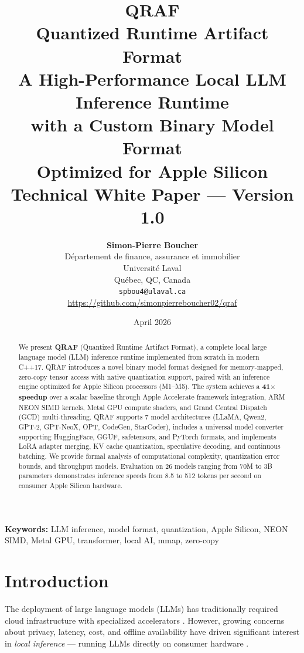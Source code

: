 \documentclass[12pt,a4paper]{article}
\title{
    \vspace{-1cm}
    {\Huge\textbf{QRAF}}\\[0.3em]
    {\Large\textbf{Quantized Runtime Artifact Format}}\\[0.8em]
    {\large A High-Performance Local LLM Inference Runtime\\with a Custom Binary Model Format\\Optimized for Apple Silicon}\\[0.8em]
    {\normalsize Technical White Paper --- Version 1.0}
}
\author{
    \textbf{Simon-Pierre Boucher}\\[0.3em]
    D\'{e}partement de finance, assurance et immobilier\\
    Universit\'{e} Laval\\
    Qu\'{e}bec, QC, Canada\\[0.3em]
    \texttt{spbou4@ulaval.ca}\\[0.5em]
    \url{https://github.com/simonpierreboucher02/qraf}
}
\date{April 2026}
\begin{document}
\maketitle
\thispagestyle{empty}

\begin{abstract}
\noindent
We present \textbf{QRAF} (Quantized Runtime Artifact Format), a complete local large language model (LLM) inference runtime implemented from scratch in modern C++17. QRAF introduces a novel binary model format designed for memory-mapped, zero-copy tensor access with native quantization support, paired with an inference engine optimized for Apple Silicon processors (M1--M5). The system achieves a \textbf{41$\times$ speedup} over a scalar baseline through Apple Accelerate framework integration, ARM NEON SIMD kernels, Metal GPU compute shaders, and Grand Central Dispatch (GCD) multi-threading. QRAF supports 7 model architectures (LLaMA, Qwen2, GPT-2, GPT-NeoX, OPT, CodeGen, StarCoder), includes a universal model converter supporting HuggingFace, GGUF, safetensors, and PyTorch formats, and implements LoRA adapter merging, KV cache quantization, speculative decoding, and continuous batching. We provide formal analysis of computational complexity, quantization error bounds, and throughput models. Evaluation on 26 models ranging from 70M to 3B parameters demonstrates inference speeds from 8.5 to 512 tokens per second on consumer Apple Silicon hardware.
\end{abstract}

\vspace{0.5em}
\noindent\textbf{Keywords:} LLM inference, model format, quantization, Apple Silicon, NEON SIMD, Metal GPU, transformer, local AI, mmap, zero-copy

\newpage
\tableofcontents
\newpage

\section{Introduction}
\label{sec:introduction}

The deployment of large language models (LLMs) has traditionally required cloud infrastructure with specialized accelerators \citep{brown2020language, touvron2023llama}. However, growing concerns about privacy, latency, cost, and offline availability have driven significant interest in \emph{local inference} --- running LLMs directly on consumer hardware \citep{dettmers2022gptq, frantar2023gptq}.
\end{document}
